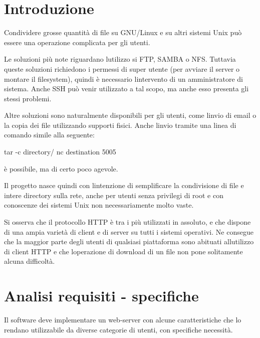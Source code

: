 \documentclass[a4paper,11pt]{article}
\begin{document}
\setcounter{tocdepth}{10}
\renewcommand\contentsname{Indice}
\tableofcontents
\listoffigures
\listoftables
\section{Introduzione}
{\sffamily
Condividere grosse quantit\`a di file su GNU/Linux e su altri sistemi
Unix pu\`o essere una operazione complicata per gli utenti.}

{\sffamily
Le soluzioni pi\`u note riguardano l{\textquotesingle}utilizzo si FTP,
SAMBA o NFS. Tuttavia queste soluzioni richiedono i permessi di super
utente (per avviare il server o montare il filesystem), quindi \`e
necessario l{\textquotesingle}intervento di un amministratore di
sistema. Anche SSH pu\`o venir utilizzato a tal scopo, ma anche esso
presenta gli stessi problemi.}

{\sffamily
Altre soluzioni sono naturalmente disponibili per gli utenti, come
l{\textquotesingle}invio di email o la copia dei file utilizzando
supporti fisici. Anche l{\textquotesingle}invio tramite una linea di
comando simile alla seguente:}

{\ttfamily
tar -c directory/ {\textbar} nc destination 5005}

{\sffamily
\`e possibile, ma di certo poco agevole.}


\bigskip

{\sffamily
Il progetto nasce quindi con l{\textquotesingle}intenzione di
semplificare la condivisione di file e intere directory sulla rete,
anche per utenti senza privilegi di root e con conoscenze dei sistemi
Unix non necessariamente molto vaste.}


\bigskip

{\sffamily
Si osserva che il protocollo HTTP \`e tra i pi\`u utilizzati in
assoluto, e che dispone di una ampia variet\`a di client e di server su
tutti i sistemi operativi. Ne consegue che la maggior parte degli
utenti di qualsiasi piattaforma sono abituati
all{\textquotesingle}utilizzo di client HTTP e che
l{\textquotesingle}operazione di download di un file non pone
solitamente alcuna difficolt\`a.}


\bigskip

\section{Analisi requisiti - specifiche}
{\sffamily
Il software deve implementare un web-server con alcune caratteristiche
che lo rendano utilizzabile da diverse categorie di utenti, con
specifiche necessit\`a.}
\end{document}
